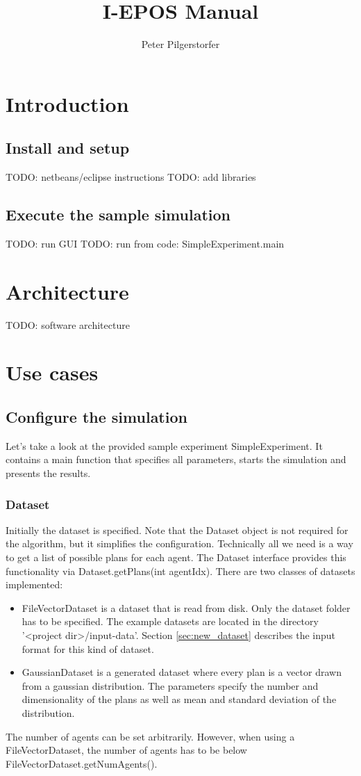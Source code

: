 \documentclass[11pt]{article} %
\title{I-EPOS Manual}
\author{Peter Pilgerstorfer}
\newcommand{\code}{}
\begin{document}
\maketitle

\section{Introduction}

\subsection{Install and setup}
TODO: netbeans/eclipse instructions
TODO: add libraries

\subsection{Execute the sample simulation}
TODO: run GUI
TODO: run from code: SimpleExperiment.main

\section{Architecture}
TODO: software architecture

\section{Use cases}
\subsection{Configure the simulation}
Let's take a look at the provided sample experiment \code{SimpleExperiment}. It contains a main function that specifies all parameters, starts the simulation and presents the results.

\subsubsection*{Dataset}
Initially the dataset is specified. Note that the \code{Dataset} object is not required for the algorithm, but it simplifies the configuration. Technically all we need is a way to get a list of possible plans for each agent. The \code{Dataset} interface provides this functionality via \code{Dataset.getPlans(int agentIdx)}.
There are two classes of datasets implemented:
\begin{itemize}
	\item \code{FileVectorDataset} is a dataset that is read from disk. Only the dataset folder has to be specified. The example datasets are located in the directory '<project dir>/input-data'. Section \ref{sec:new_dataset} describes the input format for this kind of dataset.
	\item \code{GaussianDataset} is a generated dataset where every plan is a vector drawn from a gaussian distribution. The parameters specify the number and dimensionality of the plans as well as mean and standard deviation of the distribution.
\end{itemize}
The number of agents can be set arbitrarily. However, when using a \code{FileVectorDataset}, the number of agents has to be below \code{FileVectorDataset.getNumAgents()}.
\end{document}
